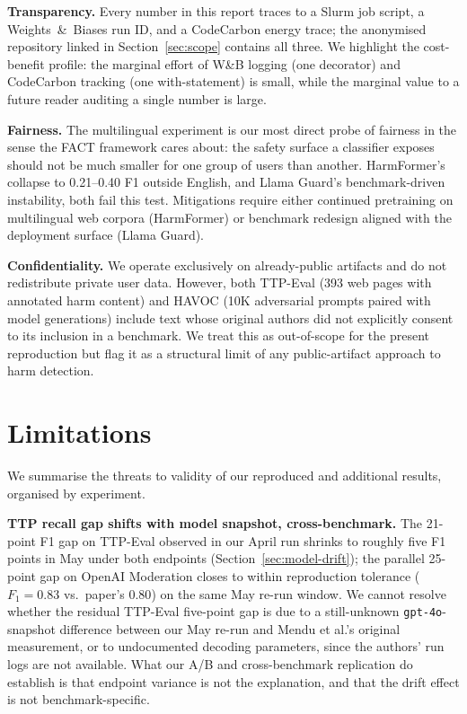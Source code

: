\documentclass[10pt]{article} %
\begin{document}
\textbf{Transparency.} Every number in this report traces to a Slurm job script, a Weights~\&~Biases run ID, and a CodeCarbon energy trace; the anonymised repository linked in Section~\ref{sec:scope} contains all three. We highlight the cost-benefit profile: the marginal effort of W\&B logging (one decorator) and CodeCarbon tracking (one with-statement) is small, while the marginal value to a future reader auditing a single number is large.

\textbf{Fairness.} The multilingual experiment is our most direct probe of fairness in the sense the FACT framework cares about: the safety surface a classifier exposes should not be much smaller for one group of users than another. HarmFormer's collapse to 0.21--0.40 F1 outside English, and Llama Guard's benchmark-driven instability, both fail this test. Mitigations require either continued pretraining on multilingual web corpora (HarmFormer) or benchmark redesign aligned with the deployment surface (Llama Guard).

\textbf{Confidentiality.} We operate exclusively on already-public artifacts and do not redistribute private user data. However, both TTP-Eval (393 web pages with annotated harm content) and HAVOC (10K adversarial prompts paired with model generations) include text whose original authors did not explicitly consent to its inclusion in a benchmark. We treat this as out-of-scope for the present reproduction but flag it as a structural limit of any public-artifact approach to harm detection.

\section{Limitations}
\label{sec:limitations}

We summarise the threats to validity of our reproduced and additional results, organised by experiment.

\textbf{TTP recall gap shifts with model snapshot, cross-benchmark.} The 21-point F1 gap on TTP-Eval observed in our April run shrinks to roughly five F1 points in May under both endpoints (Section~\ref{sec:model-drift}); the parallel 25-point gap on OpenAI Moderation closes to within reproduction tolerance ($F_1=0.83$ vs.\ paper's $0.80$) on the same May re-run window. We cannot resolve whether the residual TTP-Eval five-point gap is due to a still-unknown \texttt{gpt-4o}-snapshot difference between our May re-run and Mendu et al.'s original measurement, or to undocumented decoding parameters, since the authors' run logs are not available. What our A/B and cross-benchmark replication do establish is that endpoint variance is not the explanation, and that the drift effect is not benchmark-specific.
\end{document}
